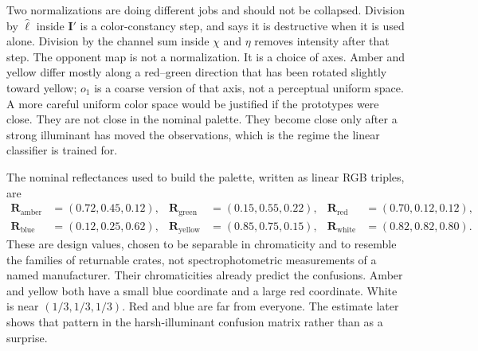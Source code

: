 Two normalizations are doing different jobs and should not be collapsed. Division by $\hat{\ell}$ inside $\mathbf{I}'$ is a color-constancy step, and  says it is destructive when it is used alone. Division by the channel sum inside $\chi$ and $\eta$ removes intensity after that step. The opponent map is not a normalization. It is a choice of axes. Amber and yellow differ mostly along a red--green direction that has been rotated slightly toward yellow; $o_1$ is a coarse version of that axis, not a perceptual uniform space. A more careful uniform color space would be justified if the prototypes were close. They are not close in the nominal palette. They become close only after a strong illuminant has moved the observations, which is the regime the linear classifier is trained for.

The nominal reflectances used to build the palette, written as linear RGB triples, are
\begin{equation}
\begin{aligned}
\mathbf{R}_{\text{amber}}&=(0.72,0.45,0.12),&
\mathbf{R}_{\text{green}}&=(0.15,0.55,0.22),&
\mathbf{R}_{\text{red}}&=(0.70,0.12,0.12),\\
\mathbf{R}_{\text{blue}}&=(0.12,0.25,0.62),&
\mathbf{R}_{\text{yellow}}&=(0.85,0.75,0.15),&
\mathbf{R}_{\text{white}}&=(0.82,0.82,0.80).
\end{aligned}
\label{eq:prototypes}
\end{equation}
These are design values, chosen to be separable in chromaticity and to resemble the families of returnable crates, not spectrophotometric measurements of a named manufacturer. Their chromaticities already predict the confusions. Amber and yellow both have a small blue coordinate and a large red coordinate. White is near $(1/3,1/3,1/3)$. Red and blue are far from everyone. The estimate later shows that pattern in the harsh-illuminant confusion matrix rather than as a surprise.

